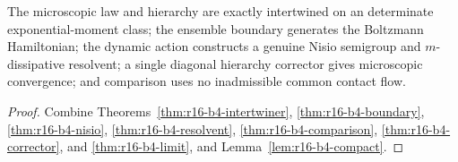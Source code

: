 \begin{theorem}
\label{thm:r16-b4-main}
The microscopic law and hierarchy are exactly intertwined on an
determinate exponential-moment class; the ensemble boundary generates the
Boltzmann Hamiltonian; the dynamic action constructs a genuine Nisio semigroup
and \(m\)-dissipative resolvent; a single diagonal hierarchy corrector gives
microscopic convergence; and comparison uses no inadmissible common contact
flow.
\end{theorem}

\begin{proof}
Combine Theorems~\ref{thm:r16-b4-intertwiner},
\ref{thm:r16-b4-boundary}, \ref{thm:r16-b4-nisio},
\ref{thm:r16-b4-resolvent}, \ref{thm:r16-b4-comparison},
\ref{thm:r16-b4-corrector}, and \ref{thm:r16-b4-limit}, and
Lemma~\ref{lem:r16-b4-compact}.
\end{proof}
